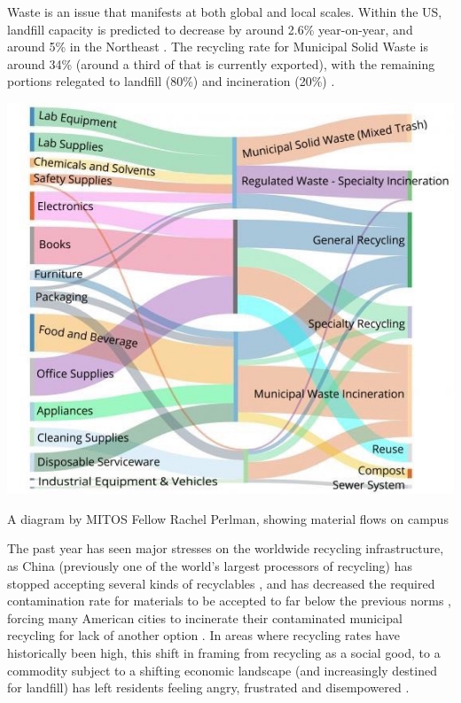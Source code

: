 \documentclass[nofonts,nols,justified,nobib]{tufte-book}
\begin{document}
Waste is an issue that manifests at both global and local scales. Within the US, landfill capacity is predicted to decrease by around 2.6\% year-on-year, and around 5\% in the Northeast \cite{waste_business_journal_waste_2017}. The recycling rate for Municipal Solid Waste is around 34\% (around a third of that is currently exported), with the remaining portions relegated to landfill (80\%) and incineration (20\%) \cite{epa_advancing_2018}. 
\begin{marginfigure}
\includegraphics[width=\textwidth]{img/2/perlman-material.jpg}
\caption{A diagram by MITOS Fellow Rachel Perlman, showing material flows on campus}
\end{marginfigure}
The past year has seen major stresses on the worldwide recycling infrastructure, as China (previously one of the world's largest processors of recycling) has stopped accepting several kinds of recyclables \cite{albeck-ripka_your_2018}, and has decreased the required contamination rate for materials to be accepted to far below the previous norms \cite{germin_chinas_2018}, forcing many American cities to incinerate their contaminated municipal recycling for lack of another option \cite{milman_moment_2019, albeck-ripka_your_2018}. In areas where recycling rates have historically been high, this shift in framing from recycling as a social good, to a commodity subject to a shifting economic landscape (and increasingly destined for landfill) has left residents feeling angry, frustrated and disempowered \cite{albeck-ripka_your_2018}.
\end{document}
